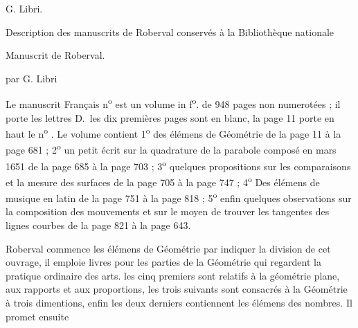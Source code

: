 \documentclass[11pt,a4paper]{article}
\begin{document}

G. Libri.

Description des manuscrits de Roberval conservés à la Bibliothèque nationale


Manuscrit de Roberval.

par G. Libri

Le manuscrit Français n\textsuperscript{o} \quad est un volume in f\textsuperscript{o}. de 948 pages non numerotées ; il porte les lettres D.\ les dix premières pages sont en blanc, la page 11 porte en haut le n\textsuperscript{o} . Le volume contient 1\textsuperscript{o} des élémens de Géométrie de la page 11 à la page 681 ; 2\textsuperscript{o} un petit écrit sur la quadrature de la parabole composé en mars 1651 de la page 685 à la page 703 ; 3\textsuperscript{o} quelques propositions sur les comparaisons et la mesure des surfaces de la page 705 à la page 747 ; 4\textsuperscript{o} Des élémens de musique en latin de la page 751 à la page 818 ; 5\textsuperscript{o} enfin quelques observations sur la composition des mouvements et sur le moyen de trouver les tangentes des lignes courbes de la page 821 à la page 643.

Roberval commence les élémens de Géométrie par indiquer la division de cet ouvrage, il emploie  livres pour les parties de la Géométrie qui regardent la pratique ordinaire des arts. les cinq premiers sont relatifs à la géométrie plane, aux rapports et aux proportions, les trois suivants sont consacrés à la Géométrie à trois dimentions, enfin les deux derniers contiennent les élémens des nombres. Il promet ensuite
\end{document}
